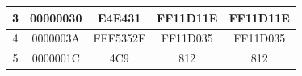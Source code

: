 \begin{table}[!ht]
{\begin{tabular}{|c|c|cc|c|}
            3                                                                     & 00000030               & \multicolumn{1}{c|}{E4E431}                                                          & FF11D11E                                                           & FF11D11E                                                                                                     \\ \hline
            4                                                                     & 0000003A               & \multicolumn{1}{c|}{FFF5352F}                                                        & FF11D035                                                           & FF11D035                                                                                                     \\ \hline
            5                                                                     & 0000001C               & \multicolumn{1}{c|}{4C9}                                                             & 812                                                                & 812                                                                                                          \\ \hline
        \end{tabular}%
    }
\end{table}